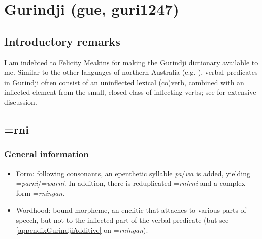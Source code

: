 \section{Gurindji (gue, guri1247)}
\label{appendixGurindji}

\subsection{Introductory remarks}
I am indebted to Felicity Meakins for making the Gurindji dictionary \parencite{MeakinsEtAl2013} available to me. Similar to the other languages of northern Australia (e.g. \cite{Bowern2014}), verbal predicates in Gurindji often consist of an uninflected lexical (co)verb, combined with an inflected element from the small, closed class of inflecting verbs; see \textcite[442–481]{MeakinsMcConvell2021} for extensive discussion.

\subsection{=rni}
\subsubsection{General information}
\begin{itemize}
	\sloppy
	\item Form: following consonants, an epenthetic syllable \textit{pa}/\textit{wa} is added, yielding \mbox{=\textit{parni}}/\mbox{=\textit{warni}}. In addition, there is reduplicated \mbox{=\textit{rnirni}} and a complex form \mbox{=\textit{rningan}}.
	\item Wordhood: bound morpheme, an enclitic that attaches to various parts of speech, but not to the inflected part of the verbal predicate (but see –\ref{appendixGurindjiAdditive}  on \mbox{=\textit{rningan}}).
 \end{itemize}

